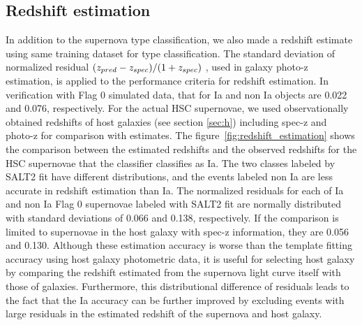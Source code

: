 \documentclass[useamsfonts]{pasj01}
\begin{document}
\subsection{Redshift estimation}
%
In addition to the supernova type classification,
we also made a redshift estimate using same training dataset for type classification.
The standard deviation of normalized residual $(z_{\rm pred}-z_{\rm spec})/(1+z_{\rm spec})$ \citep{Salvato_2009,Salvato_2019}, used in galaxy photo-z estimation, is applied to the performance criteria for redshift estimation.
In verification with Flag 0 simulated data, that for Ia and non Ia objects are 0.022 and 0.076, respectively.
For the actual HSC supernovae, we used observationally obtained redshifts of host galaxies (see section \ref{sec:h}) including spec-z and photo-z for comparison with estimates.
The figure\ \ref{fig:redshift_estimation} shows the comparison between the estimated redshifts and the observed redshifts for the HSC supernovae that the classifier classifies as Ia.
The two classes labeled by SALT2 fit have different distributions, and the events labeled non Ia are less accurate in redshift estimation than Ia.
The normalized residuals for each of Ia and non Ia Flag 0 supernovae labeled with SALT2 fit are normally distributed with standard deviations of 0.066 and 0.138, respectively.
If the comparison is limited to supernovae in the host galaxy with spec-z information, they are 0.056 and 0.130.
Although these estimation accuracy is worse than the template fitting accuracy using host galaxy photometric data, it is useful for selecting host galaxy by comparing the redshift estimated from the supernova light curve itself with those of galaxies.
Furthermore, this distributional difference of residuals leads to the fact that the Ia accuracy can be further improved by excluding events with large residuals in the estimated redshift of the supernova and host galaxy.
%
\end{document}
